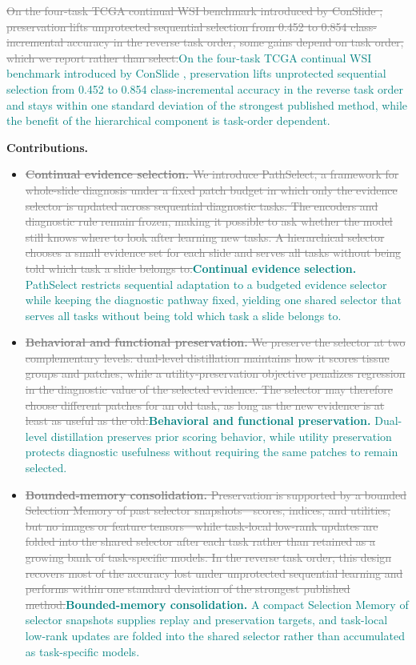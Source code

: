 \documentclass{article}
\newif\ifmarkup \markuptrue
\newcommand{\repc}[3]{\ifmarkup\textcolor{gray}{\sout{#2}}\textcolor{#1}{#3}\else#3\fi}
\newcommand{\repG}[2]{\repc{teal}{#1}{#2}}    %
\begin{document}
\repG{On the four-task TCGA continual WSI benchmark introduced by ConSlide \cite{huang2023conslide}, preservation lifts unprotected sequential selection from 0.452 to 0.854 class-incremental accuracy in the reverse task order, some gains depend on task order, which we report rather than select.}{On the four-task TCGA continual WSI benchmark introduced by ConSlide \cite{huang2023conslide}, preservation lifts unprotected sequential selection from 0.452 to 0.854 class-incremental accuracy in the reverse task order and stays within one standard deviation of the strongest published method, while the benefit of the hierarchical component is task-order dependent.}

\textbf{Contributions.}
\begin{itemize}
    \item \repG{\textbf{Continual evidence selection.} We introduce PathSelect, a framework for whole-slide diagnosis under a fixed patch budget in which only the evidence selector is updated across sequential diagnostic tasks. The encoders and diagnostic rule remain frozen, making it possible to ask whether the model still knows where to look after learning new tasks. A hierarchical selector chooses a small evidence set for each slide and serves all tasks without being told which task a slide belongs to.}{\textbf{Continual evidence selection.} PathSelect restricts sequential adaptation to a budgeted evidence selector while keeping the diagnostic pathway fixed, yielding one shared selector that serves all tasks without being told which task a slide belongs to.}
    \item \repG{\textbf{Behavioral and functional preservation.} We preserve the selector at two complementary levels: dual-level distillation maintains how it scores tissue groups and patches, while a utility-preservation objective penalizes regression in the diagnostic value of the selected evidence. The selector may therefore choose different patches for an old task, as long as the new evidence is at least as useful as the old.}{\textbf{Behavioral and functional preservation.} Dual-level distillation preserves prior scoring behavior, while utility preservation protects diagnostic usefulness without requiring the same patches to remain selected.}
    \item \repG{\textbf{Bounded-memory consolidation.} Preservation is supported by a bounded Selection Memory of past selector snapshots---scores, indices, and utilities, but no images or feature tensors---while task-local low-rank updates are folded into the shared selector after each task rather than retained as a growing bank of task-specific models. In the reverse task order, this design recovers most of the accuracy lost under unprotected sequential learning and performs within one standard deviation of the strongest published method.}{\textbf{Bounded-memory consolidation.} A compact Selection Memory of selector snapshots supplies replay and preservation targets, and task-local low-rank updates are folded into the shared selector rather than accumulated as task-specific models.}
\end{itemize}
\end{document}
